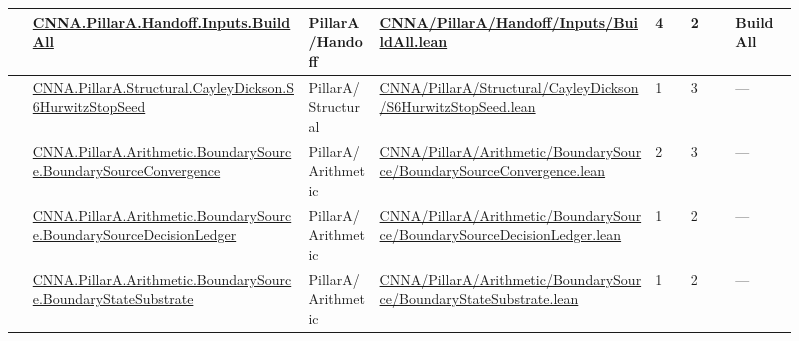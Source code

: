 \begin{longtable}{L{0.025\linewidth} L{0.315\linewidth} L{0.08\linewidth} L{0.315\linewidth} L{0.045\linewidth} L{0.055\linewidth} L{0.07\linewidth}}
\hline
{} & \href{run:repo_snapshot/CNNA/PillarA/Handoff/Inputs/BuildAll.lean}{CNNA.\allowbreak{}PillarA.\allowbreak{}Handoff.\allowbreak{}Inputs.\allowbreak{}BuildAll} & PillarA/\allowbreak{}Handoff & \href{run:repo_snapshot/CNNA/PillarA/Handoff/Inputs/BuildAll.lean}{CNNA/\allowbreak{}PillarA/\allowbreak{}Handoff/\allowbreak{}Inputs/\allowbreak{}BuildAll.\allowbreak{}lean} & 4 & 2 & BuildAll\\
\hline
{} & \href{run:repo_snapshot/CNNA/PillarA/Structural/CayleyDickson/S6HurwitzStopSeed.lean}{CNNA.\allowbreak{}PillarA.\allowbreak{}Structural.\allowbreak{}CayleyDickson.\allowbreak{}S6HurwitzStopSeed} & PillarA/\allowbreak{}Structural & \href{run:repo_snapshot/CNNA/PillarA/Structural/CayleyDickson/S6HurwitzStopSeed.lean}{CNNA/\allowbreak{}PillarA/\allowbreak{}Structural/\allowbreak{}CayleyDickson/\allowbreak{}S6HurwitzStopSeed.\allowbreak{}lean} & 1 & 3 & ---\\
\hline
{} & \href{run:repo_snapshot/CNNA/PillarA/Arithmetic/BoundarySource/BoundarySourceConvergence.lean}{CNNA.\allowbreak{}PillarA.\allowbreak{}Arithmetic.\allowbreak{}BoundarySource.\allowbreak{}BoundarySourceConvergence} & PillarA/\allowbreak{}Arithmetic & \href{run:repo_snapshot/CNNA/PillarA/Arithmetic/BoundarySource/BoundarySourceConvergence.lean}{CNNA/\allowbreak{}PillarA/\allowbreak{}Arithmetic/\allowbreak{}BoundarySource/\allowbreak{}BoundarySourceConvergence.\allowbreak{}lean} & 2 & 3 & ---\\
\hline
{} & \href{run:repo_snapshot/CNNA/PillarA/Arithmetic/BoundarySource/BoundarySourceDecisionLedger.lean}{CNNA.\allowbreak{}PillarA.\allowbreak{}Arithmetic.\allowbreak{}BoundarySource.\allowbreak{}BoundarySourceDecisionLedger} & PillarA/\allowbreak{}Arithmetic & \href{run:repo_snapshot/CNNA/PillarA/Arithmetic/BoundarySource/BoundarySourceDecisionLedger.lean}{CNNA/\allowbreak{}PillarA/\allowbreak{}Arithmetic/\allowbreak{}BoundarySource/\allowbreak{}BoundarySourceDecisionLedger.\allowbreak{}lean} & 1 & 2 & ---\\
\hline
{} & \href{run:repo_snapshot/CNNA/PillarA/Arithmetic/BoundarySource/BoundaryStateSubstrate.lean}{CNNA.\allowbreak{}PillarA.\allowbreak{}Arithmetic.\allowbreak{}BoundarySource.\allowbreak{}BoundaryStateSubstrate} & PillarA/\allowbreak{}Arithmetic & \href{run:repo_snapshot/CNNA/PillarA/Arithmetic/BoundarySource/BoundaryStateSubstrate.lean}{CNNA/\allowbreak{}PillarA/\allowbreak{}Arithmetic/\allowbreak{}BoundarySource/\allowbreak{}BoundaryStateSubstrate.\allowbreak{}lean} & 1 & 2 & ---\\

\end{longtable}
